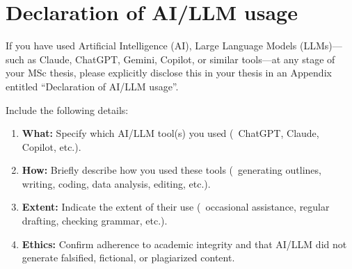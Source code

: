 
\chapter{Declaration of AI/LLM usage}

If you have used Artificial Intelligence (AI), Large Language Models (LLMs)---such as Claude, ChatGPT, Gemini, Copilot, or similar tools---at any stage of your MSc thesis, please explicitly disclose this in your thesis in an Appendix entitled ``Declaration of AI/LLM usage''. 

Include the following details:
\begin{enumerate}
  \item \textbf{What:} Specify which AI/LLM tool(s) you used (\eg\ ChatGPT, Claude, Copilot, etc.).
  \item \textbf{How:} Briefly describe how you used these tools (\eg\ generating outlines, writing, coding, data analysis, editing, etc.).
  \item \textbf{Extent:} Indicate the extent of their use (\eg\ occasional assistance, regular drafting, checking grammar, etc.).
  \item \textbf{Ethics:} Confirm adherence to academic integrity and that AI/LLM did not generate falsified, fictional, or plagiarized content.
\end{enumerate}
